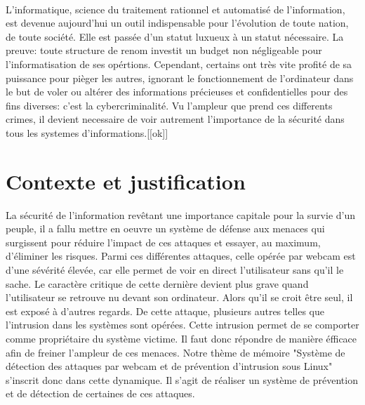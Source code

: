 \introduction
    \paragraph{}
      \small{
      L'informatique, science du traitement rationnel et automatisé de l'information, est devenue aujourd'hui un outil indispensable pour l'évolution de toute nation, de toute société. Elle est passée d'un statut luxueux à un statut nécessaire. La preuve: toute structure de renom investit un budget non n\'egligeable pour l'informatisation de ses opértions. Cependant, certains ont très vite profité de sa puissance pour pièger les autres, ignorant le fonctionnement de l'ordinateur dans le but de voler ou alt\'erer des informations précieuses et confidentielles pour des fins diverses: c'est la cybercriminalité. Vu l'ampleur que prend ces differents crimes, il devient necessaire de voir autrement l'importance de la s\'ecurit\'e dans tous les systemes d'informations.[[ok]]
    
    \section{Contexte et justification}
       La sécurité de l'information revêtant une importance capitale pour la survie d'un peuple, il a fallu mettre en oeuvre un système de défense aux menaces qui surgissent pour réduire l'impact de ces attaques et essayer, au maximum, d'éliminer les risques. Parmi ces différentes attaques, celle opérée par webcam est d'une sévérité élevée, car elle permet de voir en direct l'utilisateur sans qu'il le sache. Le caractère critique de cette dernière devient plus grave quand l'utilisateur se retrouve nu devant son ordinateur. Alors qu'il se croit être seul, il est exposé à d'autres regards. De cette attaque, plusieurs autres telles que l'intrusion dans les systèmes sont opérées. Cette intrusion permet de se comporter comme propriétaire du système victime. Il faut donc répondre de manière éfficace afin de freiner l'ampleur de ces menaces. Notre thème de mémoire "Système de détection des attaques par webcam et de prévention d’intrusion sous Linux" s'inscrit donc dans cette dynamique. Il s'agit de réaliser un système de prévention et de détection de certaines de ces attaques. 
	}
    
